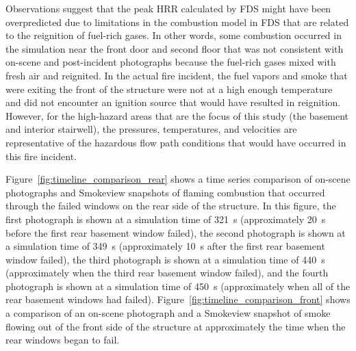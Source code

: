 \documentclass[12pt,oneside]{book}
\begin{document}
Observations suggest that the peak HRR calculated by FDS might have been overpredicted due to limitations in the combustion model in FDS that are related to the reignition of fuel-rich gases. In other words, some combustion occurred in the simulation near the front door and second floor that was not consistent with on-scene and post-incident photographs because the fuel-rich gases mixed with fresh air and reignited. In the actual fire incident, the fuel vapors and smoke that were exiting the front of the structure were not at a high enough temperature and did not encounter an ignition source that would have resulted in reignition. However, for the high-hazard areas that are the focus of this study (the basement and interior stairwell), the pressures, temperatures, and velocities are representative of the hazardous flow path conditions that would have occurred in this fire incident.

Figure~\ref{fig:timeline_comparison_rear} shows a time series comparison of on-scene photographs and Smokeview snapshots of flaming combustion that occurred through the failed windows on the rear side of the structure. In this figure, the first photograph is shown at a simulation time of 321~s (approximately 20~s before the first rear basement window failed), the second photograph is shown at a simulation time of 349~s (approximately 10~s after the first rear basement window failed), the third photograph is shown at a simulation time of 440~s (approximately when the third rear basement window failed), and the fourth photograph is shown at a simulation time of 450~s (approximately when all of the rear basement windows had failed). Figure~\ref{fig:timeline_comparison_front} shows a comparison of an on-scene photograph and a Smokeview snapshot of smoke flowing out of the front side of the structure at approximately the time when the rear windows began to fail.
\end{document}
